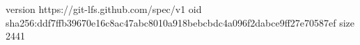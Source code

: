 version https://git-lfs.github.com/spec/v1
oid sha256:ddf7ffb39670e16c8ac47abc8010a918bebcbdc4a096f2dabce9ff27e70587ef
size 2441
